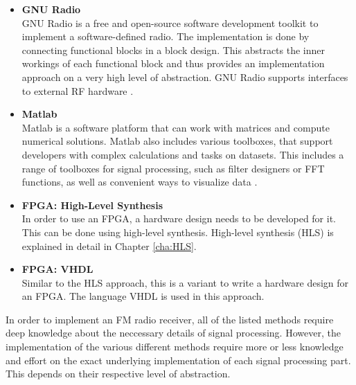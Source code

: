 \begin{itemize}
  \item \textbf{GNU Radio}\\
      GNU Radio is a free and open-source software development toolkit to implement a software-defined radio.
      The implementation is done by connecting functional blocks in a block design.
      This abstracts the inner workings of each functional block and thus provides an implementation approach on a very high level of abstraction.
      GNU Radio supports interfaces to external RF hardware \cite{SoftwareGnuRadio}.
  \item \textbf{Matlab}\\
      Matlab is a software platform that can work with matrices and compute numerical solutions.
      Matlab also includes various toolboxes, that support developers with complex calculations and tasks on datasets.
      This includes a range of toolboxes for signal processing, such as filter designers or FFT functions, as well as convenient ways to visualize data \cite{SoftwareMatlab}.
  \item \textbf{FPGA: \cplusplus High-Level Synthesis}\\
      In order to use an FPGA, a hardware design needs to be developed for it.
      This can be done using high-level synthesis.
      High-level synthesis (HLS) is explained in detail in Chapter \ref{cha:HLS}.
  \item \textbf{FPGA: VHDL}\\
      Similar to the HLS approach, this is a variant to write a hardware design for an FPGA.
      The language VHDL is used in this approach.
\end{itemize}

In order to implement an FM radio receiver, all of the listed methods require deep knowledge about the neccessary details of signal processing.
However, the implementation of the various different methods require more or less knowledge and effort on the exact underlying implementation of each signal processing part.
This depends on their respective level of abstraction.


